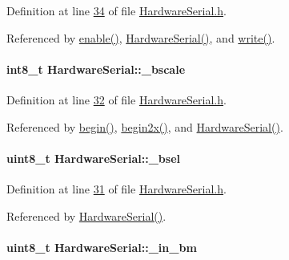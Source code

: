 Definition at line \hyperlink{_hardware_serial_8h_source_l00034}{34} of file \hyperlink{_hardware_serial_8h_source}{HardwareSerial.h}.



Referenced by \hyperlink{_hardware_serial_8cpp_source_l00248}{enable()}, \hyperlink{_hardware_serial_8cpp_source_l00112}{HardwareSerial()}, and \hyperlink{_hardware_serial_8cpp_source_l00240}{write()}.

\hypertarget{class_hardware_serial_a37dd406c01fd6432618925f0aeb329f3}{
\paragraph[{\_\-bscale}]{\setlength{\rightskip}{0pt plus 5cm}int8\_\-t {\bf HardwareSerial::\_\-bscale}}\hfill}
\label{class_hardware_serial_a37dd406c01fd6432618925f0aeb329f3}


Definition at line \hyperlink{_hardware_serial_8h_source_l00032}{32} of file \hyperlink{_hardware_serial_8h_source}{HardwareSerial.h}.



Referenced by \hyperlink{_hardware_serial_8cpp_source_l00140}{begin()}, \hyperlink{_hardware_serial_8cpp_source_l00173}{begin2x()}, and \hyperlink{_hardware_serial_8cpp_source_l00112}{HardwareSerial()}.

\hypertarget{class_hardware_serial_acc6c13c76a56c8b4bb88c3385b7bc791}{
\paragraph[{\_\-bsel}]{\setlength{\rightskip}{0pt plus 5cm}uint8\_\-t {\bf HardwareSerial::\_\-bsel}}\hfill}
\label{class_hardware_serial_acc6c13c76a56c8b4bb88c3385b7bc791}


Definition at line \hyperlink{_hardware_serial_8h_source_l00031}{31} of file \hyperlink{_hardware_serial_8h_source}{HardwareSerial.h}.



Referenced by \hyperlink{_hardware_serial_8cpp_source_l00112}{HardwareSerial()}.

\hypertarget{class_hardware_serial_a8724fdfd3955eeff5d3ed535624ce79a}{
\paragraph[{\_\-in\_\-bm}]{\setlength{\rightskip}{0pt plus 5cm}uint8\_\-t {\bf HardwareSerial::\_\-in\_\-bm}}\hfill}
\label{class_hardware_serial_a8724fdfd3955eeff5d3ed535624ce79a}


